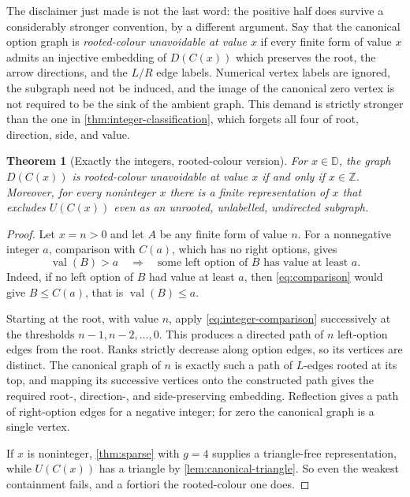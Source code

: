 \documentclass[11pt,a4paper]{article}
\numberwithin{equation}{section}
\newtheorem{theorem}{Theorem}[section]
\theoremstyle{definition}
\theoremstyle{remark}
\newcommand{\D}{\mathbb{D}}
\newcommand{\Z}{\mathbb{Z}}
\newcommand{\val}{\operatorname{val}}
\newcommand{\can}{C}
\begin{document}
The disclaimer just made is not the last word: the positive half does survive a
considerably stronger convention, by a different argument. Say that the
canonical option graph is \emph{rooted-colour unavoidable at value $x$} if every
finite form of value $x$ admits an injective embedding of $D(\can(x))$ which
preserves the root, the arrow directions, and the $L/R$ edge labels. Numerical
vertex labels are ignored, the subgraph need not be induced, and the image of the
canonical zero vertex is not required to be the sink of the ambient graph. This
demand is strictly stronger than the one in \cref{thm:integer-classification},
which forgets all four of root, direction, side, and value.

\begin{theorem}[Exactly the integers, rooted-colour version]
\label{thm:classification-rooted}
For $x\in\D$, the graph $D(\can(x))$ is rooted-colour unavoidable at value $x$ if
and only if $x\in\Z$. Moreover, for every noninteger $x$ there is a finite
representation of $x$ that excludes $U(\can(x))$ even as an unrooted,
unlabelled, undirected subgraph.
\end{theorem}

\begin{proof}
Let $x=n>0$ and let $A$ be any finite form of value $n$. For a nonnegative
integer $a$, comparison with $\can(a)$, which has no right options, gives
\begin{equation}
\label{eq:integer-comparison}
 \val(B)>a
 \quad\Longrightarrow\quad
 \text{some left option of }B\text{ has value at least }a .
\end{equation}
Indeed, if no left option of $B$ had value at least $a$, then
\eqref{eq:comparison} would give $B\leq\can(a)$, that is $\val(B)\leq a$.

Starting at the root, with value $n$, apply \eqref{eq:integer-comparison}
successively at the thresholds $n-1,n-2,\ldots,0$. This produces a directed path
of $n$ left-option edges from the root. Ranks strictly decrease along option
edges, so its vertices are distinct. The canonical graph of $n$ is exactly such a
path of $L$-edges rooted at its top, and mapping its successive vertices onto the
constructed path gives the required root-, direction-, and side-preserving
embedding. Reflection gives a path of right-option edges for a negative integer;
for zero the canonical graph is a single vertex.

If $x$ is noninteger, \cref{thm:sparse} with $g=4$ supplies a triangle-free
representation, while $U(\can(x))$ has a triangle by
\cref{lem:canonical-triangle}. So even the weakest containment fails, and a
fortiori the rooted-colour one does.
\end{proof}
\end{document}
